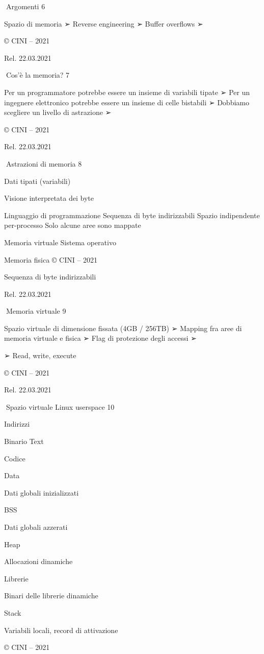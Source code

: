 \documentclass[11pt,a4paper]{article}
\begin{document}
Argomenti 6

Spazio di memoria ➢ Reverse engineering ➢ Buffer overflows ➢

© CINI -- 2021

Rel. 22.03.2021

Cos'è la memoria? 7

Per un programmatore potrebbe essere un insieme di variabili tipate ➢
Per un ingegnere elettronico potrebbe essere un insieme di celle
bistabili ➢ Dobbiamo scegliere un livello di astrazione ➢

© CINI -- 2021

Rel. 22.03.2021

Astrazioni di memoria 8

Dati tipati (variabili)

Visione interpretata dei byte

Linguaggio di programmazione Sequenza di byte indirizzabili Spazio
indipendente per-processo Solo alcune aree sono mappate

Memoria virtuale Sistema operativo

Memoria fisica © CINI -- 2021

Sequenza di byte indirizzabili

Rel. 22.03.2021

Memoria virtuale 9

Spazio virtuale di dimensione fissata (4GB / 256TB) ➢ Mapping fra aree
di memoria virtuale e fisica ➢ Flag di protezione degli accessi ➢

➢ Read, write, execute

© CINI -- 2021

Rel. 22.03.2021

Spazio virtuale Linux userspace 10

Indirizzi

Binario Text

Codice

Data

Dati globali inizializzati

BSS

Dati globali azzerati

Heap

Allocazioni dinamiche

Librerie

Binari delle librerie dinamiche

Stack

Variabili locali, record di attivazione

© CINI -- 2021
\end{document}
